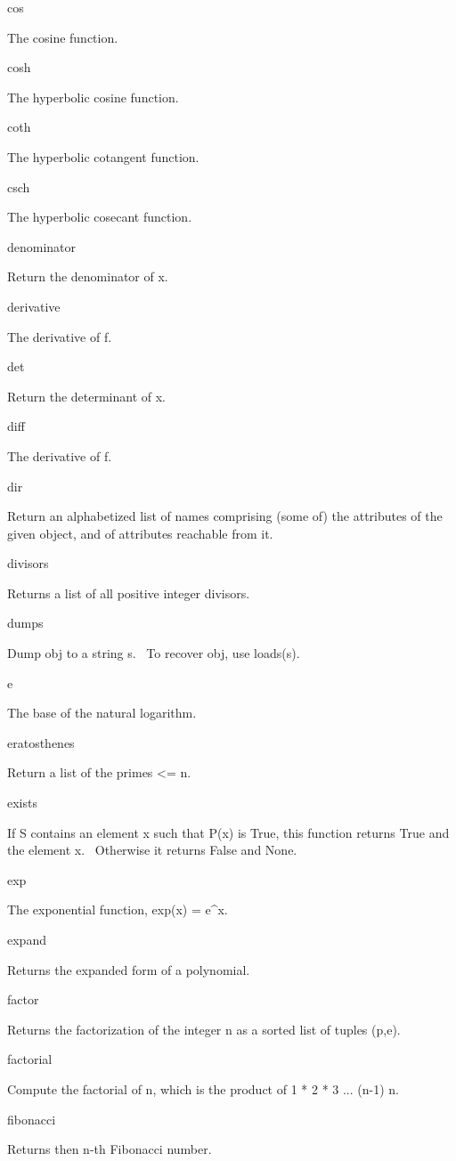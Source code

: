 \documentclass[12pt,twoside]{book}
\begin{document}
cos

The cosine function.

cosh

The hyperbolic cosine function.

coth

The hyperbolic cotangent function.

csch

The hyperbolic cosecant function.

denominator

Return the denominator of x.

derivative

The derivative of f.

det

Return the determinant of x.

diff

The derivative of f.

dir

Return an alphabetized list of names comprising (some of) the attributes
of the given object, and of attributes reachable from it.

divisors

Returns a list of all positive integer divisors.

dumps

Dump obj to a string s. \ To recover obj, use loads(s).

e

The base of the natural logarithm.

eratosthenes

Return a list of the primes {\textless}= n.

exists

If S contains an element x such that P(x) is True, this function returns
True and the element x. \ Otherwise it returns False and None.

exp

The exponential function, exp(x) = e\^{}x.

expand

Returns the expanded form of a polynomial.

factor

Returns the factorization of the integer n as a sorted list of tuples
(p,e).

factorial

Compute the factorial of n, which is the product of 1 * 2 * 3 ...
(n{}-1) n.

fibonacci

Returns then n{}-th Fibonacci number.
\end{document}
